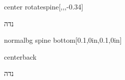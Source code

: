 \documentclass[
coverheight=10.0in,
coverwidth=6.25in,
spinewidth=0.6875in,
bleedwidth=.125in,
marklength=0in,
12pt,
pagecolor=background,
]{bookcover}
\newcommand{\hebtitle}{
נדה}
\newcommand{\engtitle}{
}
\newcommand{\setspineheight}{
\fontsize{0.584375in}{0.584375in}\selectfont}
\newcommand{\hebtext}[1]{
	\begin{hebrew}
		#1
	\end{hebrew}
}
\begin{document}
	\begin{bookcover}
		\begin{bookcoverelement}{center rotate}{spine}[,,,-0.34\coverheight]
			\textcolor{text}{\setspineheight\hebtext{\hebtitle} \space \engtitle }
		\end{bookcoverelement}
		\begin{bookcoverelement}{normal}{bg spine bottom}[0.1\spinewidth,0in,0.1\spinewidth,0in]
		\end{bookcoverelement}
		
		\begin{bookcoverelement}{center}{back}
			\begin{Huge}
				\textcolor{text}{\hebtext{\hebtitle}}
				\textcolor{text}{\engtitle}
			\end{Huge}
			\vspace{2\baselineskip}
			\begin{large}
			\end{large}
		\end{bookcoverelement}
	\end{bookcover}
\end{document}
